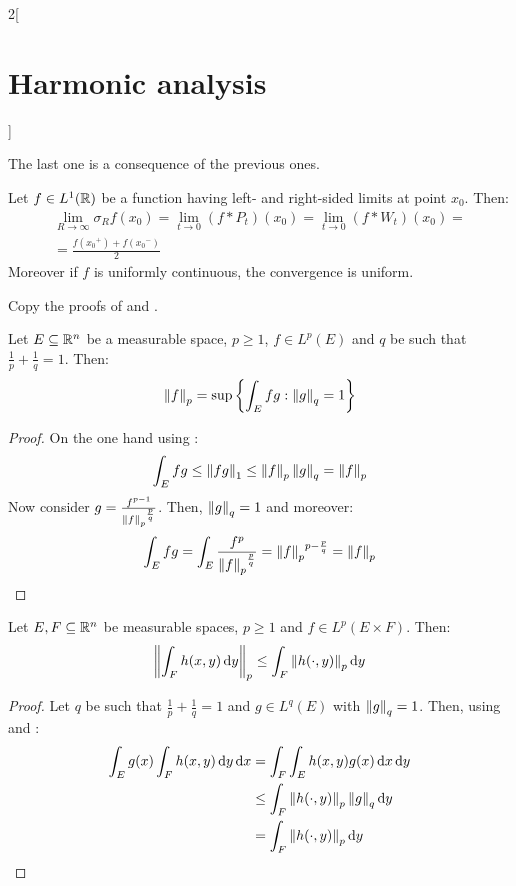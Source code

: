 \documentclass[../../../main_math.tex]{subfiles}
\begin{document}
\begin{multicols}{2}[\section{Harmonic analysis}]
\begin{sproof}
    The last one is a consequence of the previous ones.
  \end{sproof}
  \begin{theorem}
    Let $f\in L^1(\mathbb{R})$ be a function having left- and right-sided limits at point $x_0$. Then:
    \begin{multline*}
      \lim_{R\to\infty}\sigma_Rf(x_0)=\lim_{t\to 0}(f*P_t)(x_0)=\lim_{t\to 0}(f*W_t)(x_0)=\\=\frac{f({x_0}^+)+f({x_0}^-)}{2}
    \end{multline*}
    Moreover if $f$ is uniformly continuous, the convergence is uniform.
  \end{theorem}
  \begin{sproof}
    Copy the proofs of  and .
  \end{sproof}
  \begin{lemma}\label{HA:normLpEquiv}
    Let $E\subseteq\mathbb{R}^n$ be a measurable space, $p\geq 1$, $f\in L^p(E)$ and $q$ be such that $\frac{1}{p}+\frac{1}{q}=1$. Then:
    $$\left\|f\right\|_p=\sup\left\{\int_Efg:\left\|g\right\|_q=1\right\}$$
  \end{lemma}
  \begin{proof}
    On the one hand using : $$\int_Efg\leq\left\|fg\right\|_1\leq\left\|f\right\|_p\left\|g\right\|_q=\left\|f\right\|_p$$
    Now consider $g=\frac{f^{p-1}}{{\left\|f\right\|_p}^{\frac{p}{q}}}$. Then, $\left\|g\right\|_q=1$ and moreover: $$\int_Efg=\int_E\frac{f^p}{{\left\|f\right\|_p}^{\frac{p}{q}}}={\left\|f\right\|_p}^{p-\frac{p}{q}}=\left\|f\right\|_p$$
  \end{proof}
  \begin{lemma}\label{HA:minkowski}
    Let $E,F\subseteq\mathbb{R}^n$ be measurable spaces, $p\geq 1$ and $f\in L^p(E\times F)$. Then:
    $$\left\|\int_F h(x,y)\dd{y}\right\|_p\leq\int_F\left\|h(\cdot,y)\right\|_p\dd{y}$$
  \end{lemma}
  \begin{proof}
    Let $q$ be such that $\frac{1}{p}+\frac{1}{q}=1$ and $g\in L^q(E)$ with $\left\|g\right\|_q=1$. Then, using  and :
    \begin{align*}
      \int_Eg(x)\int_F h(x,y)\dd{y}\dd{x} & =\int_F\int_E h(x,y)g(x)\dd{x}\dd{y}           \\
                                          & \leq \int_F\left\|h(\cdot,y)\right\|_p\left\|g\right\|_q\dd{y} \\
                                          & =\int_F\left\|h(\cdot,y)\right\|_p\dd{y}
    \end{align*}

\end{proof}
\end{multicols}
\end{document}
